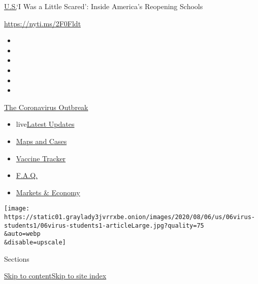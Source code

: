 \href{/section/us}{U.S.}\textbar{}`I Was a Little Scared': Inside
America's Reopening Schools

\href{https://nyti.ms/2F0Fldt}{https://nyti.ms/2F0Fldt}

\begin{itemize}
\item
\item
\item
\item
\item
\item
\end{itemize}

\href{https://www.nytimes3xbfgragh.onion/news-event/coronavirus?action=click\&pgtype=Article\&state=default\&region=TOP_BANNER\&context=storylines_menu}{The
Coronavirus Outbreak}

\begin{itemize}
\tightlist
\item
  live\href{https://www.nytimes3xbfgragh.onion/2020/08/07/world/covid-19-news.html?action=click\&pgtype=Article\&state=default\&region=TOP_BANNER\&context=storylines_menu}{Latest
  Updates}
\item
  \href{https://www.nytimes3xbfgragh.onion/interactive/2020/us/coronavirus-us-cases.html?action=click\&pgtype=Article\&state=default\&region=TOP_BANNER\&context=storylines_menu}{Maps
  and Cases}
\item
  \href{https://www.nytimes3xbfgragh.onion/interactive/2020/science/coronavirus-vaccine-tracker.html?action=click\&pgtype=Article\&state=default\&region=TOP_BANNER\&context=storylines_menu}{Vaccine
  Tracker}
\item
  \href{https://www.nytimes3xbfgragh.onion/interactive/2020/world/coronavirus-tips-advice.html?action=click\&pgtype=Article\&state=default\&region=TOP_BANNER\&context=storylines_menu}{F.A.Q.}
\item
  \href{https://www.nytimes3xbfgragh.onion/live/2020/08/07/business/stock-market-today-coronavirus?action=click\&pgtype=Article\&state=default\&region=TOP_BANNER\&context=storylines_menu}{Markets
  \& Economy}
\end{itemize}

\texttt{[image: https://static01.graylady3jvrrxbe.onion/images/2020/08/06/us/06virus-students1/06virus-students1-articleLarge.jpg?quality=75\\\&auto=webp\\\&disable=upscale]}

Sections

\protect\hyperlink{site-content}{Skip to
content}\protect\hyperlink{site-index}{Skip to site index}

